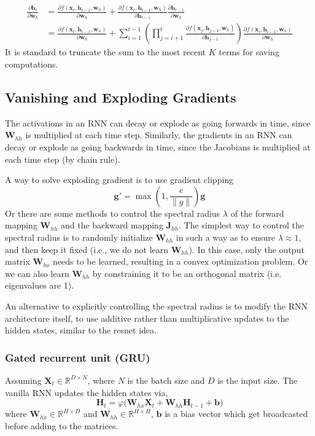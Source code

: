 \documentclass[11pt]{article}
\begin{document}
\[
\begin{aligned}
\frac{\partial \boldsymbol{h}_t}{\partial \boldsymbol{w}_h}
&= \frac{\partial f(\boldsymbol{x}_t, \boldsymbol{h}_{t-1}, \boldsymbol{w}_h)}{\partial \boldsymbol{w}_h}
+ \frac{\partial f(\boldsymbol{x}_t, \boldsymbol{h}_{t-1}, \boldsymbol{w}_h)}{\partial \boldsymbol{h}_{t-1}} \frac{\partial \boldsymbol{h}_{t-1}}{\partial \boldsymbol{w}_h} \\
&= \frac{\partial f(\boldsymbol{x}_t, \boldsymbol{h}_{t-1}, \boldsymbol{w}_h)}{\partial \boldsymbol{w}_h}
+ \sum_{i=1}^{t-1} \left( \prod_{j=i+1}^{t} \frac{\partial f(\boldsymbol{x}_j, \boldsymbol{h}_{j-1}, \boldsymbol{w}_h)}{\partial \boldsymbol{h}_{j-1}} \right) \frac{\partial f(\boldsymbol{x}_i, \boldsymbol{h}_{i-1}, \boldsymbol{w}_h)}{\partial \boldsymbol{w}_h}
\end{aligned}
\]
It is standard to truncate the sum to the most recent $K$ terms for saving computations.

\subsection{Vanishing and Exploding Gradients}
The activations in an RNN can decay or explode as going forwards in time, since $\mathbf{W}_{hh}$ is multiplied at each time step.
Similarly, the gradients in an RNN can decay or explode as going backwards in time, since the Jacobians is multiplied at each time step (by chain rule).

A way to solve exploding gradient is to use gradient clipping
\[
\boldsymbol{g}' = \max (1, \frac{c}{\| g \|}) \boldsymbol{g}
\]
Or there are some methods to control the spectral radius $\lambda$ of the forward mapping $\mathbf{W}_{hh}$ and the backward mapping $\mathbf{J}_{hh}$.
The simplest way to control the spectral radius is to randomly initialize $\mathbf{W}_{hh}$ in such a way as to ensure $\lambda \approx 1$, and then keep it fixed (i.e., we do not learn $\mathbf{W}_{hh}$). 
In this case, only the output matrix $\mathbf{W}_{ho}$ needs to be learned, resulting in a convex optimization problem.
Or we can also learn $\mathbf{W}_{hh}$ by constraining it to be an orthogonal matrix (i.e. eigenvalues are 1).

An alternative to explicitly controlling the spectral radius is to modify the RNN architecture itself,
to use additive rather than multiplicative updates to the hidden states, similar to the resnet idea.

\subsubsection*{Gated recurrent unit (GRU)}
Assuming $\mathbf{X}_t \in \mathbb{R}^{D \times N}$, where $N$ is the batch size and $D$ is the input size. The vanilla RNN updates the hidden states via,
\[
\mathbf{H}_t = \varphi \big(\mathbf{W}_{hx}\mathbf{X}_t + \mathbf{W}_{hh}\mathbf{H}_{t-1} + \boldsymbol{b} \big)
\]
where $\mathbf{W}_{hx} \in \mathbb{R}^{H \times D}$ and $\mathbf{W}_{hh} \in \mathbb{R}^{H \times H}$, $\boldsymbol{b}$ is a bias vector which get broadcasted before adding to the matrices.
\end{document}

